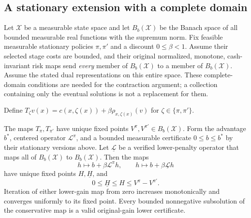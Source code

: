 \subsection{A stationary extension with a complete domain}

Let $\mathcal X$ be a measurable state space and let
$B_b(\mathcal X)$ be the Banach space of all bounded measurable real
functions with the supremum norm. Fix feasible measurable stationary
policies $\pi,\pi'$ and a discount $0\le\beta<1$. Assume their selected
stage costs are bounded, and their original normalized, monotone,
cash-invariant risk maps send \emph{every} member of $B_b(\mathcal X)$
to a member of $B_b(\mathcal X)$. Assume the stated dual representations
on this entire space. These complete-domain conditions are needed for
the contraction argument; a collection containing only the eventual
solutions is not a replacement for them.

Define $T_\zeta v(x)=c(x,\zeta(x))+\beta\rho_{x,\zeta(x)}(v)$ for
$\zeta\in\{\pi,\pi'\}$.

\begin{proposition}
\label{prop:stationarygain122}
The maps $T_\pi,T_{\pi'}$ have unique fixed points
$V^\pi,V^{\pi'}\in B_b(\mathcal X)$. Form the advantage $b^*$,
centered operator $\mathcal L^\pi$, and a bounded measurable certificate
$0\le b\le b^*$ by their stationary versions above. Let
$\underline{\mathcal L}$ be a verified lower-penalty operator that maps
all of $B_b(\mathcal X)$ to $B_b(\mathcal X)$.
Then the maps
\[
 h\longmapsto b+\beta\mathcal L^\pi h,
 \qquad h\longmapsto b+\beta\underline{\mathcal L}h
\]
have unique fixed points $H,\underline H$, and
\[
       0\le\underline H\le H\le V^\pi-V^{\pi'}.
\]
Iteration of either lower-gain map from zero increases monotonically
and converges uniformly to its fixed point. Every bounded nonnegative
subsolution of the conservative map is a valid original-gain lower
certificate.
\end{proposition}

